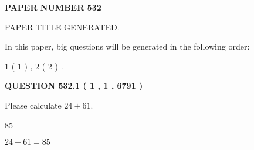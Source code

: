 \documentclass[12pt]{article}
\begin{document}
   
   
   
\newpage 
\setcounter{page}{ 
   532001 } 
   
   
   
   
 {\textbf{ \Large{ PAPER NUMBER  532  }}}
   
   
\vspace{0.2in}
   
   
   
   
   
   
   
   
 \vspace{0.2in}
 
 
 
 
   
   
 PAPER TITLE GENERATED.
   
   
   
\vspace{0.2in}
   
In this paper, big questions will be generated in the following order: 
   
   
   1 ( 1 )
 ,
   2 ( 2 )
 .
  
\vspace{0.2in}
  
{\textbf{\Large{QUESTION
532.1 
 ( 1 , 1 , 6791 )
}}}
  
  
 
Please calculate $ %
24 +  %
61 $.
 
 
 
\noindent{}
 
 

85
 
 
\noindent{}
 
 

 
 
 
\noindent{}
 
 

$ %
24 +  %
61=   %
85$
 
 
\noindent{}
 
 

 
   
   
   
\end{document}
